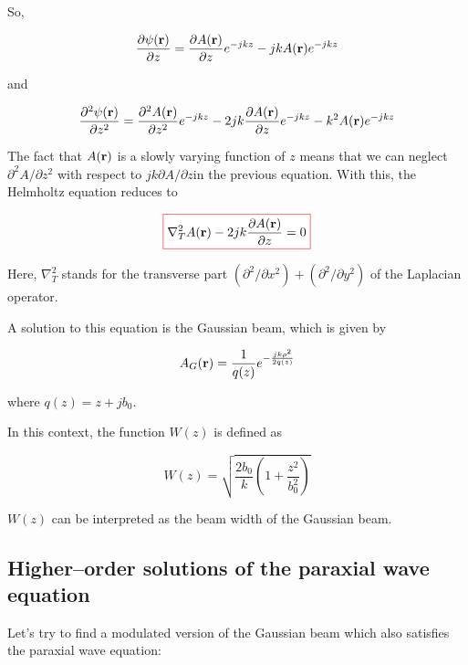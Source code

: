 So,

\begin{equation}
\frac{\partial \psi({\bf r})}{\partial z} = \frac {\partial A({\bf r})}{\partial z}e^{-jkz} -j k A({\bf r})e^{-jkz}
\end{equation} 

and

\begin{equation}
\frac{\partial^2 \psi({\bf r})}{\partial z^2} = \frac{\partial^2 A({\bf r})}{\partial z^2}e^{-jkz} - 2 j k \frac{\partial A({\bf r})}{\partial z}e^{-jkz} - k^2 A({\bf r})e^{-jkz}
\end{equation} 

The fact that $A({\bf r})$ is a slowly varying function of $z$ means that we can neglect $\partial^2 A / \partial z^2$ with respect to $j k \partial A / \partial z$in the previous equation. With this, the Helmholtz equation reduces to

\begin{equation}
\fbox{$\displaystyle
\nabla_T^2 A({\bf r}) -2jk \frac{\partial A({\bf r})}{\partial z} = 0
$}
\label{eq-paraxial}
\end{equation} 

Here, $\nabla_T^2$ stands for the transverse part $(\partial^2 / \partial x^2) + (\partial^2 / \partial y^2)$ of the Laplacian operator.

A solution to this equation is the Gaussian beam, which is given by

\begin{equation}
A_G({\bf r}) = \frac{1}{q(z)}e^{-\frac{jk\rho^2}{2q(z)}} \label{eq-gauss}
\end{equation}   

where $q(z)=z+jb_0$. 

In this context, the function $W(z)$ is defined as

\begin{equation}
W(z)=\sqrt{\frac{2 b_0}{k} \left(1 + \frac{z^2}{b_0^2}\right)} \label{eq-W}
\end{equation} 

$W(z)$ can be interpreted as the beam width of the Gaussian beam.

\subsection*{Higher--order solutions of the paraxial wave equation}

Let's try to find a modulated version of the Gaussian beam which also satisfies the paraxial wave equation:

